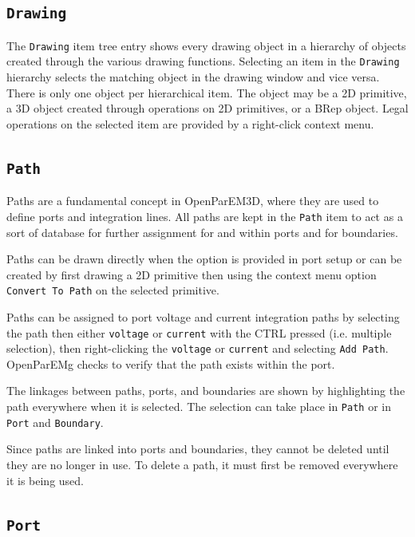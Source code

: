 \documentclass[titlepage]{article}
\renewcommand\_{\textunderscore\linebreak[1]}
\begin{document}
\subsection{\texttt{Drawing}}

The \texttt{Drawing} item tree entry shows every drawing object in a hierarchy of objects created through the various drawing functions.  Selecting an item in the \texttt{Drawing} hierarchy selects the matching object in the drawing window and vice versa.  There is only one object per hierarchical item.  The object may be a 2D primitive, a 3D object created through operations on 2D primitives, or a BRep object.  Legal operations on the selected item are provided by a right-click context menu.

\subsection{\texttt{Path}}

Paths are a fundamental concept in OpenParEM3D, where they are used to define ports and integration lines.  All paths are kept in the \texttt{Path} item to act as a sort of database for further assignment for and within ports and for boundaries.

Paths can be drawn directly when the option is provided in port setup or can be created by first drawing a 2D primitive then using the context menu option \texttt{Convert To Path} on the selected primitive.

Paths can be assigned to port voltage and current integration paths by selecting the path then either \texttt{voltage} or \texttt{current} with the CTRL pressed (i.e. multiple selection), then right-clicking the \texttt{voltage} or \texttt{current} and selecting \texttt{Add Path}.  OpenParEMg checks to verify that the path exists within the port.

The linkages between paths, ports, and boundaries are shown by highlighting the path everywhere when it is selected.  The selection can take place in \texttt{Path} or in \texttt{Port} and \texttt{Boundary}.

Since paths are linked into ports and boundaries, they cannot be deleted until they are no longer in use.  To delete a path, it must first be removed everywhere it is being used. 

\subsection{\texttt{Port}}
\end{document}

